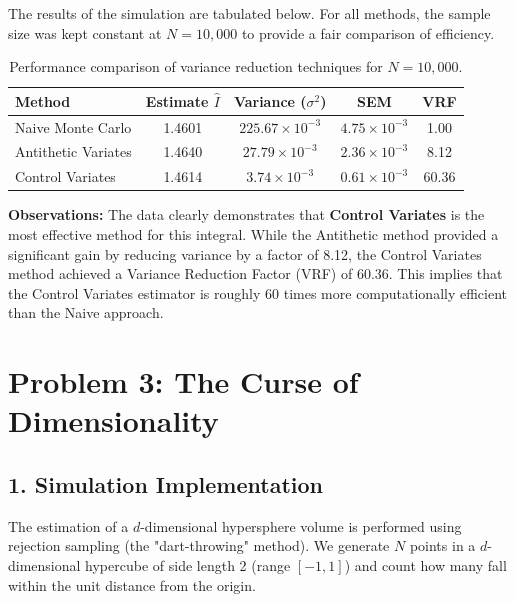 \documentclass{article}
\begin{document}
The results of the simulation are tabulated below. For all methods, the sample size was kept constant at $N = 10,000$ to provide a fair comparison of efficiency.

\begin{table}[h!]
    \centering
    \renewcommand{\arraystretch}{1.2} %
    \begin{tabular}{|l|c|c|c|c|}
    \hline
    \textbf{Method} & \textbf{Estimate $\hat{I}$} & \textbf{Variance ($\sigma^2$)} & \textbf{SEM} & \textbf{VRF} \\ \hline
    Naive Monte Carlo   & 1.4601 & $225.67 \times 10^{-3}$ & $4.75 \times 10^{-3}$ & 1.00 \\ \hline
    Antithetic Variates & 1.4640 & $27.79 \times 10^{-3}$  & $2.36 \times 10^{-3}$ & 8.12 \\ \hline
    Control Variates    & 1.4614 & $3.74 \times 10^{-3}$   & $0.61 \times 10^{-3}$ & 60.36 \\ \hline
    \end{tabular}
    \caption{Performance comparison of variance reduction techniques for $N=10,000$.}
\end{table}

\textbf{Observations:}
The data clearly demonstrates that \textbf{Control Variates} is the most effective method for this integral. While the Antithetic method provided a significant gain by reducing variance by a factor of 8.12, the Control Variates method achieved a Variance Reduction Factor (VRF) of 60.36.  This implies that the Control Variates estimator is roughly 60 times more computationally efficient than the Naive approach. 

\newpage
\section*{Problem 3: The Curse of Dimensionality}

\subsection*{1. Simulation Implementation}

The estimation of a $d$-dimensional hypersphere volume is performed using rejection sampling (the "dart-throwing" method). We generate $N$ points in a $d$-dimensional hypercube of side length 2 (range $[-1, 1]$) and count how many fall within the unit distance from the origin.
\end{document}
